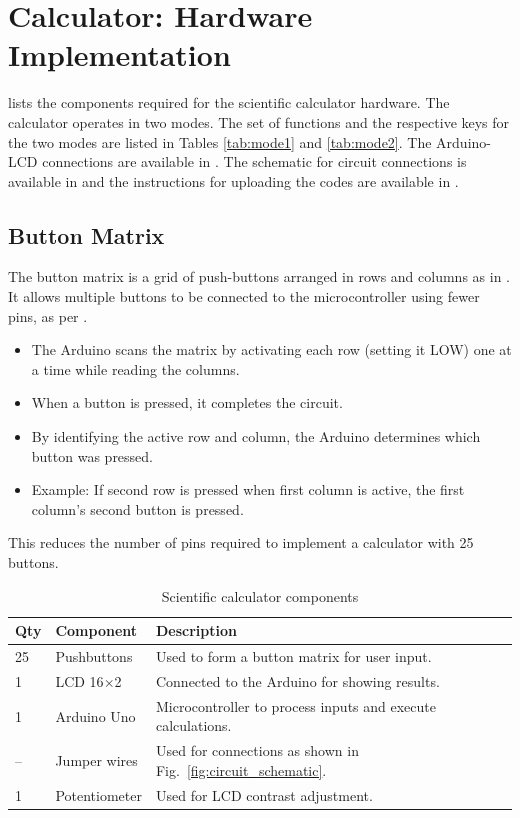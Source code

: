 \documentclass[conference]{IEEEtran}
\begin{document}
\section{Calculator: Hardware Implementation}

lists the components required for the scientific calculator hardware.
 The calculator operates in two modes.  The set of functions and the respective keys for the two modes are listed in 
Tables 
\ref{tab:mode1}
and
\ref{tab:mode2}. The Arduino-LCD connections are available in . 
The schematic for circuit connections is available in 
 and the instructions for uploading the codes are available in 
.
\subsection{Button Matrix}
The button matrix is a grid of push-buttons arranged in rows and columns as in . It allows multiple buttons to be connected to the microcontroller using fewer pins, as per .
\begin{itemize}
    \item The Arduino scans the matrix by activating each row (setting it LOW) one at a time while reading the columns.
    \item When a button is pressed, it completes the circuit.
    \item By identifying the active row and column, the Arduino determines which button was pressed.
    \item Example: If second row is pressed when first column is active, the first column's second button is pressed.
\end{itemize}
This reduces the number of pins required to implement a calculator with 25 buttons.
\begin{table}[H]
\centering
\caption{Scientific calculator components}
\label{tab:materials}
\small
\renewcommand{\arraystretch}{1.3}
\begin{tabularx}{\columnwidth}{l l X}
\toprule
\textbf{Qty} & \textbf{Component} & \textbf{Description} \\
\midrule
25 & Pushbuttons & Used to form a button matrix for user input. \\
1  & LCD 16$\times$2 & Connected to the Arduino for showing results. \\
1  & Arduino Uno & Microcontroller to process inputs and execute calculations. \\
-- & Jumper wires & Used for connections as shown in Fig.~\ref{fig:circuit_schematic}. \\
1  & Potentiometer & Used for LCD contrast adjustment. \\
\bottomrule
\end{tabularx}
\end{table}
\end{document}
